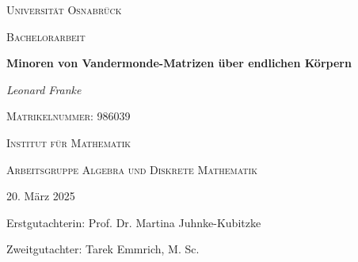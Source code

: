 \begin{titlepage}
\begin{center}
    \LARGE \textsc{Universität Osnabrück}

    \vspace{1cm}

    \Large \textsc{Bachelorarbeit}

    \vspace{1.5cm}

    \Huge \textbf{Minoren von Vandermonde-Matrizen über endlichen Körpern}

    \vspace{1.5cm}

    \Large \textit{Leonard Franke}

    \textsc{Matrikelnummer:} 986039

    \vspace{1cm}

    \textsc{Institut für Mathematik}

    \textsc{Arbeitsgruppe Algebra und Diskrete Mathematik}

    \vfill

    \normalsize 20. März 2025 

    Erstgutachterin: Prof. Dr. Martina Juhnke-Kubitzke 

    Zweitgutachter: Tarek Emmrich, M. Sc.
\end{center}
\end{titlepage}